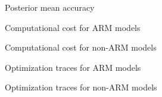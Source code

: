 \documentclass[8pt]{beamer}\usepackage[]{graphicx}\usepackage[]{color}
\begin{document}
\begin{frame}{Posterior mean accuracy}
    \PosteriorMeanAccuracy{}
\end{frame}


\begin{frame}{Computational cost for ARM models}
\RuntimeARM{}
\end{frame}


\begin{frame}{Computational cost for non-ARM models}
    \RuntimeNonARM{}
\end{frame}


\begin{frame}{Optimization traces for ARM models}
    \TracesARM{}
\end{frame}


\begin{frame}{Optimization traces for non-ARM models}
    \TracesNonARM{}
\end{frame}


\end{document}
